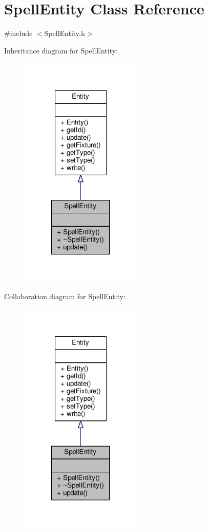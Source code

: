 \hypertarget{class_spell_entity}{\section{Spell\-Entity Class Reference}
\label{class_spell_entity}
}


{\ttfamily \#include $<$Spell\-Entity.\-h$>$}



Inheritance diagram for Spell\-Entity\-:
\nopagebreak
\begin{figure}[H]
\begin{center}
\leavevmode
\includegraphics[width=164pt]{class_spell_entity__inherit__graph}
\end{center}
\end{figure}


Collaboration diagram for Spell\-Entity\-:
\nopagebreak
\begin{figure}[H]
\begin{center}
\leavevmode
\includegraphics[width=164pt]{class_spell_entity__coll__graph}
\end{center}
\end{figure}
